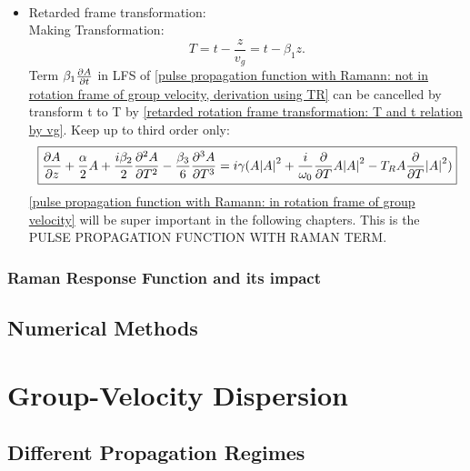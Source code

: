 \documentclass[12pt]{extarticle}
\numberwithin{equation}{section}
\numberwithin{figure}{section}
\numberwithin{table}{section}
\newcommand{\<}{\langle}
\renewcommand{\>}{\rangle}
\theoremstyle{definition}
\begin{document}
\begin{itemize}
\begin{equation}
\begin{split}
                \end{split}
                \label{pulse propagation function with Ramann: not in rotation frame of group velocity, derivation using TR}
                \end{equation}
            \item Retarded frame transformation:\\
                Making Transformation:
                \begin{equation}
                    T = t-\frac{z}{v_g}=t-\beta_1 z
                    \label{retarded rotation frame transformation: T and t relation by vg}.
                \end{equation}
                Term $\beta_1\pdv{A}{t}$ in LFS of \autoref{pulse propagation function with Ramann: not in rotation frame of group velocity, derivation using TR} can be cancelled by transform t to T by \autoref{retarded rotation frame transformation: T and t relation by vg}. Keep up to third order only:
                \begin{equation}
                    \boxed{\pdv{A}{z}+\frac{\alpha}{2}A+\frac{i\beta_2}{2}\pdv[2]{A}{T}-\frac{\beta_3}{6}\pdv[3]{A}{T} = i\gamma(A\abs{A}^2+\frac{i}{\omega_0}\pdv{}{T}A\abs{A}^2-T_R A\pdv{}{T}\abs{A}^2)}
                    \label{pulse propagation function with Ramann: in rotation frame of group velocity}
                \end{equation}
                \autoref{pulse propagation function with Ramann: in rotation frame of group velocity} will be super important in the following chapters. This is the \MakeUppercase{pulse propagation function with Raman term}.
        \end{itemize}

    \subsubsection{Raman Response Function and its impact}
    
    \subsection{Numerical Methods}
            
            
\newpage
\section{Group-Velocity Dispersion}

\subsection{Different Propagation Regimes}
\end{document}
